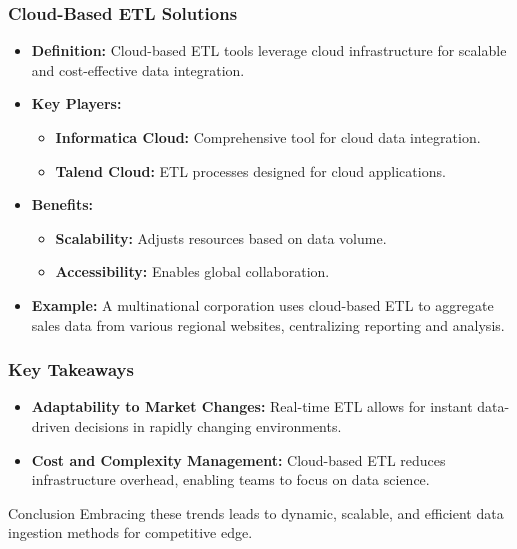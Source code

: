\documentclass[aspectratio=169]{beamer}
\begin{document}
\begin{frame}[fragile]
    \frametitle{Cloud-Based ETL Solutions}
    \begin{itemize}
        \item \textbf{Definition:}
            Cloud-based ETL tools leverage cloud infrastructure for scalable and cost-effective data integration.
        
        \item \textbf{Key Players:}
            \begin{itemize}
                \item \textbf{Informatica Cloud:} Comprehensive tool for cloud data integration.
                \item \textbf{Talend Cloud:} ETL processes designed for cloud applications.
            \end{itemize}
        
        \item \textbf{Benefits:}
            \begin{itemize}
                \item \textbf{Scalability:} Adjusts resources based on data volume.
                \item \textbf{Accessibility:} Enables global collaboration.
            \end{itemize}
        
        \item \textbf{Example:}
            A multinational corporation uses cloud-based ETL to aggregate sales data from various regional websites, centralizing reporting and analysis.
    \end{itemize}
\end{frame}

\begin{frame}[fragile]
    \frametitle{Key Takeaways}
    \begin{itemize}
        \item \textbf{Adaptability to Market Changes:}
            Real-time ETL allows for instant data-driven decisions in rapidly changing environments.
        
        \item \textbf{Cost and Complexity Management:}
            Cloud-based ETL reduces infrastructure overhead, enabling teams to focus on data science.
    \end{itemize}

    \begin{block}{Conclusion}
        Embracing these trends leads to dynamic, scalable, and efficient data ingestion methods for competitive edge.
    \end{block}
\end{frame}
\end{document}
